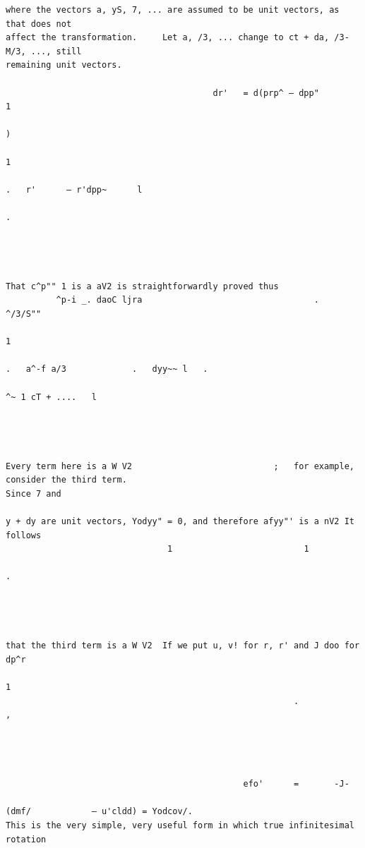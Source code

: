 \documentclass[10pt]{article}
\begin{document}
\begin{verbatim}
where the vectors a, yS, 7, ... are assumed to be unit vectors, as that does not
affect the transformation.     Let a, /3, ... change to ct + da, /3-M/3, ..., still
remaining unit vectors.

                                         dr'   = d(prp^ — dpp"              1
                                                                                )
                                                                                                     1
                                                                                                         .   r'      — r'dpp~      l
                                                                                                                                       .




That c^p"" 1 is a aV2 is straightforwardly proved thus
          ^p-i _. daoC ljra                                  .       ^/3/S""
                                                                                    1
                                                                                        .   a^-f a/3             .   dyy~~ l   .
                                                                                                                                   ^~ 1 cT + ....   l




Every term here is a W V2                            ;   for example, consider the third term.                                                                    Since 7 and

y + dy are unit vectors, Yodyy" = 0, and therefore afyy"' is a nV2 It follows
                                1                          1
                                                                                                                                                              .




that the third term is a W V2  If we put u, v! for r, r' and J doo for dp^r
                                                                            1
                                                         .                                                                                                               ,




                                               efo'      =       -J-
                                                                       (dmf/            — u'cldd) = Yodcov/.
This is the very simple, very useful form in which true infinitesimal rotation


\end{verbatim}
\end{document}
